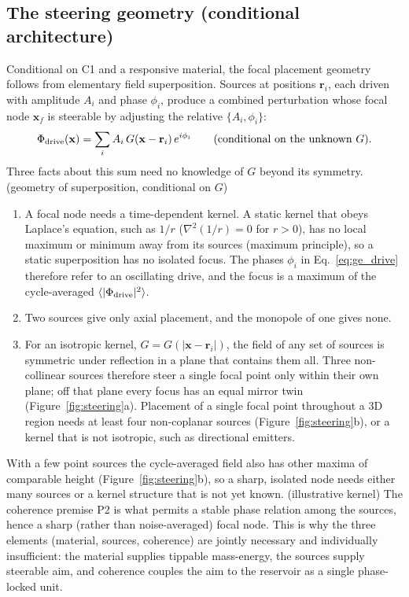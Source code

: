 \subsection{The steering geometry (conditional architecture)}\label{sec:ge_steer}
Conditional on C1 and a responsive material, the focal placement geometry follows from elementary field superposition. Sources at positions
$\mathbf r_i$, each driven with amplitude $A_i$ and phase $\phi_i$, produce a combined perturbation whose focal node $\mathbf x_f$ is steerable by
adjusting the relative $\{A_i,\phi_i\}$:
\begin{equation}
\Phi_{\rm drive}(\mathbf x)=\sum_i A_i\,G(\mathbf x-\mathbf r_i)\,e^{i\phi_i}\qquad\text{(conditional on the unknown }G).
\label{eq:ge_drive}
\end{equation}
Three facts about this sum need no knowledge of $G$ beyond its symmetry. \derived{} (geometry of superposition, conditional on $G$)
\begin{enumerate}
\item A focal node needs a time-dependent kernel. A static kernel that obeys Laplace's equation, such as $1/r$ ($\nabla^2(1/r)=0$ for $r>0$), has
no local maximum or minimum away from its sources (maximum principle), so a static superposition has no isolated focus. The phases $\phi_i$
in Eq.~\eqref{eq:ge_drive} therefore refer to an oscillating drive, and the focus is a maximum of the cycle-averaged $\langle|\Phi_{\rm drive}|^2\rangle$.
\item Two sources give only axial placement, and the monopole of one gives none.
\item For an isotropic kernel, $G=G(|\mathbf x-\mathbf r_i|)$, the field of any set of sources is symmetric under reflection in a plane that contains
them all. Three non-collinear sources therefore steer a single focal point only within their own plane; off that plane every focus has an equal mirror
twin (Figure~\ref{fig:steering}a). Placement of a single focal point throughout a 3D region needs at least four non-coplanar sources
(Figure~\ref{fig:steering}b), or a kernel that is not isotropic, such as directional emitters.
\end{enumerate}
With a few point sources the cycle-averaged field also has other maxima of comparable height (Figure~\ref{fig:steering}b), so a sharp, isolated node
needs either many sources or a kernel structure that is not yet known. \derived{} (illustrative kernel) The coherence premise P2 is what permits a
stable phase relation among the sources, hence a sharp (rather than noise-averaged) focal node. This is why the three elements (material, sources,
coherence) are jointly necessary and individually insufficient: the material supplies tippable mass-energy, the sources supply steerable aim, and
coherence couples the aim to the reservoir as a single phase-locked unit. \conjecture

